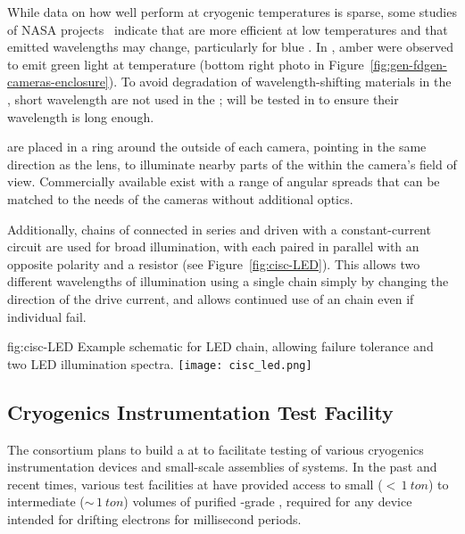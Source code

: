 While data on how well  perform at cryogenic temperatures
is sparse, some studies of NASA projects~\cite{Carron:2017zzz}
indicate that  are more efficient at low temperatures and
that emitted wavelengths may change, particularly for blue
.  In , amber  were observed  to
emit green light at  temperature (bottom right photo
in Figure~\ref{fig:gen-fdgen-cameras-enclosure}).  To avoid degradation of
wavelength-shifting materials in the , short wavelength
 are not used in the ;  will be tested
in  to ensure their wavelength is long enough.


 are placed in a ring around the outside of each
camera, pointing in the same direction as the lens, to 
illuminate nearby parts of the  within the camera's field of
view. Commercially available  exist with
a range of angular spreads that can be matched to the needs of the
cameras without additional optics.

Additionally, chains of  connected in series and driven with a
constant-current circuit are used for broad illumination, with each
 paired in parallel with an opposite polarity  and a resistor
(see Figure~\ref{fig:cisc-LED}).
This allows two different wavelengths of illumination using a single chain simply by changing the direction of the drive current, and allows continued use of an  chain even if individual  fail.

\begin{dunefigure}{fig:cisc-LED}
  {Example schematic for LED chain, allowing failure tolerance and two LED illumination spectra.}
  \texttt{[image: cisc\_led.png]}
\end{dunefigure}


\subsection{Cryogenics Instrumentation Test Facility}
The  consortium plans to build a  at  to facilitate testing of various cryogenics instrumentation devices and small-scale assemblies of  systems. 
In the past and recent times, various test facilities at  have provided access to small ($<\,\SI{1}{ton}$) to intermediate ($\sim\,\SI{1}{ton}$) volumes of purified -grade , required for %
any device intended for drifting electrons for millisecond periods. 



